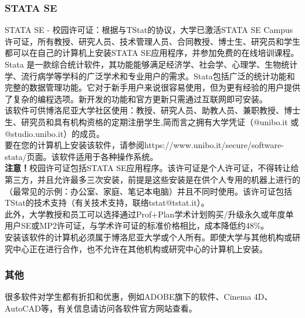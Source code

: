\subsubsection{STATA SE}
STATA SE - 校园许可证：根据与TStat的协议，大学已激活STATA SE Campus许可证，所有教授、研究人员、技术管理人员、合同教授、博士生、研究员和学生都可以在自己的计算机上安装STATA SE应用程序，并参加免费的在线培训课程。\\
Stata 是一款综合统计软件，其功能能够满足经济学、社会学、心理学、生物统计学、流行病学等学科的广泛学术和专业用户的需求。Stata包括广泛的统计功能和完整的数据管理功能。它对于新手用户来说很容易使用，但为更有经验的用户提供了复杂的编程选项。新开发的功能和官方更新只需通过互联网即可安装。\\
该软件可供博洛尼亚大学社区使用：教授、研究人员、助教人员、兼职教授、博士生、研究员和具有机构资格的定期注册学生,简而言之拥有大学凭证（@unibo.it 或@studio.unibo.it）的成员。\\

要在您的计算机上安装该软件，请参阅https://www.unibo.it/secure/software-stata/页面。该软件适用于各种操作系统。\\

\textbf{注意！}校园许可证包括STATA SE应用程序。该许可证是个人许可证，不得转让给第三方，并且允许最多三次安装，前提是这些安装是在供个人专用的机器上进行的（最常见的示例：办公室、家庭、笔记本电脑）并且不同时使用。该许可证包括TStat的技术支持（有关技术支持，联络tstat@tstat.it）。\\

此外，大学教授和员工可以选择通过Prof+Plan学术计划购买/升级永久或年度单用户SE或MP2许可证，与学术许可证的标准价格相比，成本降低约48\%。\\

安装该软件的计算机必须属于博洛尼亚大学或个人所有。即使大学与其他机构或研究中心正在进行合作，也不允许在其他机构或研究中心的计算机上安装。


\subsubsection{其他}
很多软件对学生都有折扣和优惠，例如ADOBE旗下的软件、Cinema 4D、AutoCAD等，有关信息请访问各软件官方网站查看。

